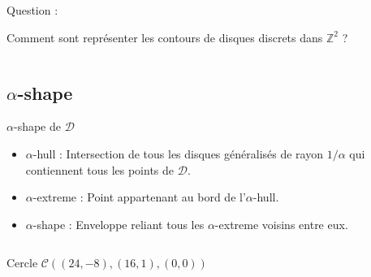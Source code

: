 \documentclass{beamer}
\begin{document}
\begin{frame}
\begin{columns}[t]
\begin{column}{5cm}
        {
          \begin{block}{Question :}
            \begin{center}  
              \alert{Comment sont représenter les contours de disques discrets dans $\mathbb{Z}^{2}$ ?}
            \end{center}
          \end{block}
        }
      \end{column}
    \end{columns} 
\end{frame}

\subsection{$\alpha$-shape}
\begin{frame}
  \begin{block}{$\alpha$-shape de $\mathcal{D}$}
    \begin{itemize}
      \item $\alpha$-hull : Intersection de tous les disques généralisés de rayon $1/\alpha$ qui contiennent tous les points de $\mathcal{D}$.
      \item $\alpha$-extreme : Point appartenant au bord de l'$\alpha$-hull.
      \item $\alpha$-shape : Enveloppe reliant tous les $\alpha$-extreme voisins entre eux.
    \end{itemize}
  \end{block}
\begin{columns}[t]
  \begin{column}{4cm}
    \begin{exampleblock}{Cercle}
      $\mathcal{C} \left( (24,-8), (16,1), (0,0) \right)$\\
       

\end{exampleblock}
\end{column}
\end{columns}
\end{frame}
\end{document}
